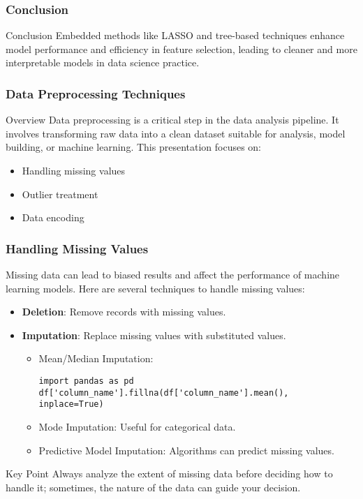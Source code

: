 \documentclass[aspectratio=169]{beamer}
\begin{document}
\begin{frame}[fragile]
    \frametitle{Conclusion}
    \begin{block}{Conclusion}
        Embedded methods like LASSO and tree-based techniques enhance model performance and efficiency in feature selection, leading to cleaner and more interpretable models in data science practice.
    \end{block}
\end{frame}

\begin{frame}
    \frametitle{Data Preprocessing Techniques}
    \begin{block}{Overview}
        Data preprocessing is a critical step in the data analysis pipeline. It involves transforming raw data into a clean dataset suitable for analysis, model building, or machine learning. This presentation focuses on:
        \begin{itemize}
            \item Handling missing values
            \item Outlier treatment
            \item Data encoding
        \end{itemize}
    \end{block}
\end{frame}

\begin{frame}[fragile]
    \frametitle{Handling Missing Values}
    Missing data can lead to biased results and affect the performance of machine learning models. Here are several techniques to handle missing values:
    \begin{itemize}
        \item \textbf{Deletion}: Remove records with missing values.
        \item \textbf{Imputation}: Replace missing values with substituted values.
            \begin{itemize}
                \item Mean/Median Imputation:
                \begin{lstlisting}
import pandas as pd
df['column_name'].fillna(df['column_name'].mean(), inplace=True)
                \end{lstlisting}
                \item Mode Imputation: Useful for categorical data.
                \item Predictive Model Imputation: Algorithms can predict missing values.
            \end{itemize}
    \end{itemize}
    \begin{block}{Key Point}
        Always analyze the extent of missing data before deciding how to handle it; sometimes, the nature of the data can guide your decision.
    \end{block}
\end{frame}
\end{document}
